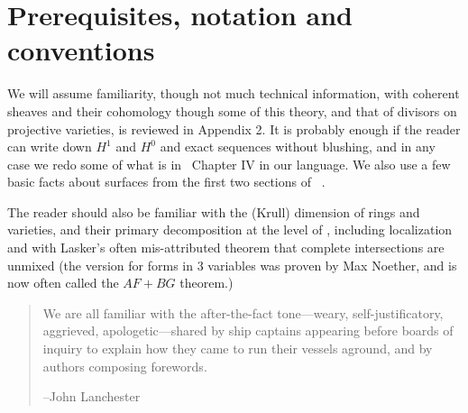 \section{Prerequisites, notation and conventions}

We will assume familiarity, though not much technical information, with coherent sheaves and their cohomology though some of this theory, and that of divisors on projective 
varieties, is reviewed in Appendix 2. It is probably enough if the reader can write down $H^1$ and $H^0$ and exact sequences without blushing, and in any case we redo some of what is in~\cite[Chapter IV]{Hartshorne1977}  Chapter IV in our language. We also use a few basic facts about surfaces from the first two sections of ~\cite[Chapter IV]{Hartshorne1977}.

The reader should also be familiar with the (Krull) dimension of rings and varieties, and their primary decomposition at the level of \cite{Atiyah-MacDonald}, including localization and with Lasker's often mis-attributed theorem that complete intersections are unmixed (the version for forms in 3 variables was proven by
Max Noether, and is now often called the $AF+BG$ theorem.)




\begin{quote}
\small\sf
We are all familiar with the after-the-fact tone---weary, self-justificatory, aggrieved, apologetic---shared by ship captains appearing before boards of inquiry to explain how they came to run their vessels aground, and by authors composing forewords.

--John Lanchester 
\bigskip

\end{quote}



\



